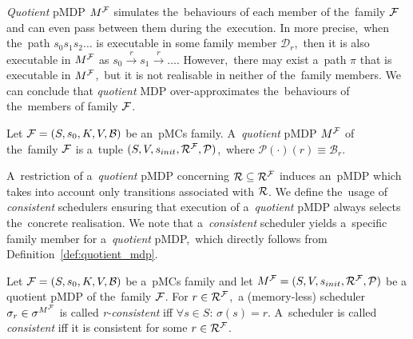 \textit{Quotient} pMDP $M^{\mathcal{F}}$ simulates the~behaviours of each member of the~family $\mathcal{F}$ and can even pass between them during the~execution.
In more precise,~when the~path $s_0s_1s_2 \dots$ is executable in some family member $\mathcal{D}_r$,~then it is also executable in $M^{\mathcal{F}}$ as $s_0 \overset{r}{\rightarrow} s_1 \overset{r}{\rightarrow} \dots$.
However,~there may exist a~path $\pi$ that is executable in $M^{\mathcal{F}}$,~but it is not realisable in neither of the~family members.
We can conclude that \textit{quotient} MDP over-approximates the~behaviours of the~members of family $\mathcal{F}$.

\begin{definition} \label{def:quotient_mdp}
\cite{roman-DP}
Let $\mathcal{F} = (S,s_{0},K, V, \mathcal{B})$ be an~pMCs family.
A~\textit{quotient} pMDP $M^{\mathcal{F}}$ of the~family $\mathcal{F}$ is a~tuple $(S, V, s_{init}, \mathcal{R}^{\mathcal{F}}, \mathcal{P})$,~where $\mathcal{P}(\cdot)(r) \equiv \mathcal{B}_r$.
\end{definition}

A~restriction of a~\textit{quotient} pMDP concerning $\mathcal{R} \subseteq \mathcal{R}^{\mathcal{F}}$ induces an~pMDP which takes into account only transitions associated with $\mathcal{R}$.
We define the~usage of \textit{consistent} schedulers ensuring that execution of a~\textit{quotient} pMDP always selects the~concrete realisation.
We note that a~\textit{consistent} scheduler yields a~specific family member for a~\textit{quotient} pMDP,~which directly follows from Definition~\ref{def:quotient_mdp}.

\begin{definition}
\cite{roman-DP}
Let $\mathcal{F} = (S,s_{0},K, V, \mathcal{B})$ be a~pMCs family and let $M^{\mathcal{F}} = (S, V, s_{init}, \mathcal{R}^{\mathcal{F}}, \mathcal{P})$ be a quotient pMDP of the~family $\mathcal{F}$.
For $r \in \mathcal{R}^{\mathcal{F}}$,~a (memory-less) scheduler $\sigma_r \in \sigma^{M^{\mathcal{F}}}$ is called \textit{r-consistent} iff $\forall s \in S: \, \sigma(s) = r$.
A~scheduler is called \textit{consistent} iff it is consistent for some $r \in \mathcal{R}^{\mathcal{F}}$.
\end{definition}